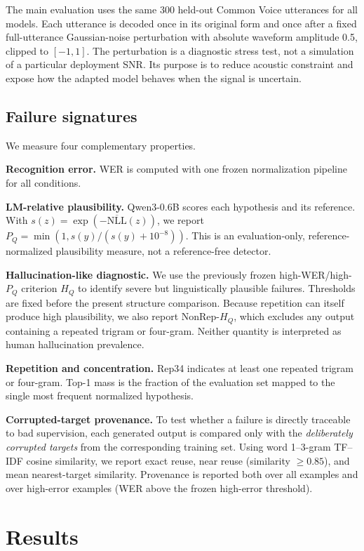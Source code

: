 \documentclass[conference]{IEEEtran}
\begin{document}
The main evaluation uses the same 300 held-out Common Voice utterances for all
models. Each utterance is decoded once in its original form and once after a
fixed full-utterance Gaussian-noise perturbation with absolute waveform
amplitude 0.5, clipped to $[-1,1]$. The perturbation is a diagnostic stress test,
not a simulation of a particular deployment SNR. Its purpose is to reduce
acoustic constraint and expose how the adapted model behaves when the signal is
uncertain.

\subsection{Failure signatures}
We measure four complementary properties.

\textbf{Recognition error.} WER is computed with one frozen normalization
pipeline for all conditions.

\textbf{LM-relative plausibility.} Qwen3-0.6B scores each hypothesis and its
reference. With $s(z)=\exp(-\overline{\mathrm{NLL}}(z))$, we report
$P_Q=\min(1,s(\hat y)/(s(y)+10^{-8}))$. This is an evaluation-only,
reference-normalized plausibility measure, not a reference-free detector.

\textbf{Hallucination-like diagnostic.} We use the previously frozen
high-WER/high-$P_Q$ criterion $H_Q$ to identify severe but linguistically
plausible failures. Thresholds are fixed before the present structure
comparison. Because repetition can itself produce high plausibility, we also
report NonRep-$H_Q$, which excludes any output containing a repeated trigram or
four-gram. Neither quantity is interpreted as human hallucination prevalence.

\textbf{Repetition and concentration.} Rep34 indicates at least one repeated
trigram or four-gram. Top-1 mass is the fraction of the evaluation set mapped to
the single most frequent normalized hypothesis.

\textbf{Corrupted-target provenance.} To test whether a failure is directly
traceable to bad supervision, each generated output is compared only with the
\emph{deliberately corrupted targets} from the corresponding training set.
Using word 1--3-gram TF--IDF cosine similarity, we report exact reuse, near reuse
(similarity $\geq0.85$), and mean nearest-target similarity. Provenance is
reported both over all examples and over high-error examples (WER above the
frozen high-error threshold).

\section{Results}
\end{document}
